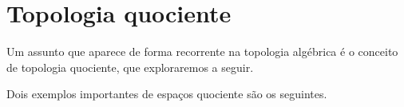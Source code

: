 \section{Topologia quociente}
\label{topologia-quociente}
Um assunto que aparece de forma recorrente na topologia algébrica é o conceito de topologia quociente, que exploraremos a seguir. 

Dois exemplos importantes de espaços quociente são os seguintes.



